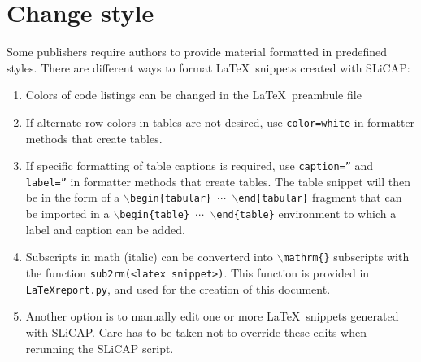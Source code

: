 \documentclass[a4paper,12pt]{article}
\begin{document}


\section{Change style}

Some publishers require authors to provide material formatted in predefined styles. There are different ways to format \LaTeX$\,$ snippets created with SLiCAP:

\begin{enumerate}
 \item Colors of code listings can be changed in the \LaTeX$\,$ preambule file
 \item If alternate row colors in tables are not desired, use {\texttt{color=white}} in formatter methods that create tables.
 \item If specific formatting of table captions is required, use {\texttt{caption=''}} and {\texttt{label=''}} in formatter methods that create tables. The table snippet will then be in the form of a {\texttt{$\backslash$begin\{tabular\} $\cdots$ $\backslash$end\{tabular\}}} fragment that can be imported
 in a {\texttt{$\backslash$begin\{table\} $\cdots$ $\backslash$end\{table\}}} environment to which a label and caption can be added.
 \item Subscripts in math (italic) can be converterd into {\texttt{$\backslash$mathrm\{\}}} subscripts with the function {\texttt{sub2rm(<latex snippet>)}}. This function is provided in {\texttt{LaTeXreport.py}}, and used for the creation of this document.

 

 \item Another option is to manually edit one or more \LaTeX$\,$ snippets generated with SLiCAP. Care has to be taken not to override these edits when rerunning the SLiCAP script.

\end{enumerate}
\end{document}
